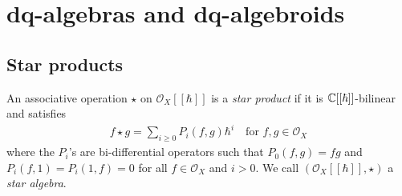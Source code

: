 \chapter{dq-algebras and dq-algebroids}\label{ch:DQ}
\section{Star products}
\begin{definition}\label{def:star-product}
	An associative operation $\star$ on $\mathscr{O}_{X}[[\hbar]]$ is a \textit{star product} if it is ${\mathbb C}[[\hbar]]$-bilinear and satisfies
	\begin{align}\label{eqn:star-product}
		f \star g = \sum_{i\geq 0} P_{i}(f,g)\hbar^{i} \quad \text{for } f,g\in \mathscr{O}_{X}
	\end{align}
	where the $P_{i}$'s are bi-differential operators such that $P_{0}(f, g)=fg$ and $P_{i}(f, 1)=P_{i}(1, f)=0$ for all $f \in \mathscr{O}_{X}$ and $i>0 .$ We call $\left(\mathscr{O}_{X}[[\hbar]], \star\right)$ a \textit{star algebra}.
\end{definition}
